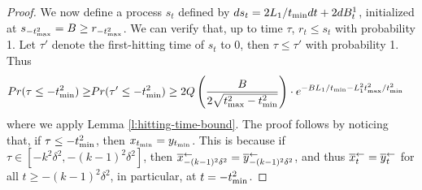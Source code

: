 \begin{proof}
    We now define a process $s_t$ defined by $d s_t = 2L_1/{t_{\textrm{min}}} dt + 2dB^1_t$, initialized at $s_{-t_{\textrm{max}}^2} = B \geq r_{-t_{\textrm{max}}^2}$. We can verify that, up to time $\tau$, $r_t \leq s_t$ with probability 1. Let $\tau'$ denote the first-hitting time of $s_t$ to $0$, then $\tau \leq \tau'$ with probability 1. Thus
    \begin{align*}
        Pr(\tau \leq -t_{\textrm{min}}^2) 
        \geq& Pr(\tau' \leq -t_{\textrm{min}}^2) \geq 2Q\left( \frac{B}{2\sqrt{t_{\textrm{max}}^2 - t_{\textrm{min}}^2}} \right) \cdot e^{-BL_1/t_{\textrm{min}} - L_1^2 t_{\textrm{max}}^2 / t_{\textrm{min}}^2}
    \end{align*}
    where we apply Lemma \ref{l:hitting-time-bound}. The proof follows by noticing that, if $\tau \leq - t_{\textrm{min}}^2$, then $x_{t_{\textrm{min}}} = y_{t_{\textrm{min}}}$. This is because if $\tau \in [- k^2 \delta^2, - (k-1)^2 \delta^2]$, then $\overline{x}^{\leftarrow}_{-(k-1)^2 \delta^2} = \overline{y}^{\leftarrow}_{-(k-1)^2 \delta^2}$, and thus $\overline{x}^{\leftarrow}_t = \overline{y}^{\leftarrow}_t$ for all $t \geq -(k-1)^2 \delta^2$, in particular, at $t = - t_{\textrm{min}}^2$. 
    
    
\end{proof}

